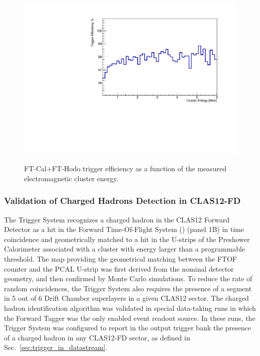 \begin{figure}[!htb]
 \centering
{\includegraphics[width=.5\textwidth]{img/FT_ClusterEfficiencyHODO.pdf}}
 \caption{FT-Cal+FT-Hodo trigger efficiency as a function of the measured electromagnetic cluster energy.}
 \label{fig:FT_ClusterEfficiencyHODO}
\end{figure}

\subsubsection{Validation of Charged Hadrons Detection in CLAS12-FD}

The Trigger System recognizes a charged hadron in the CLAS12 Forward Detector as a hit in the Forward Time-Of-Flight System (\cite{ftof-ref}) (panel 1B) in time coincidence and geometrically matched to a hit in the U-strips of the Preshower Calorimeter \cite{ec-ref} associated with a cluster with energy larger than a programmable threshold. The map providing the geometrical matching between the FTOF counter and the PCAL U-strip was first derived from the nominal detector geometry, and then confirmed by Monte Carlo simulations. To reduce the rate of random coincidences, the Trigger System also requires the presence of a segment in 5 out of 6 Drift Chamber superlayers in a given CLAS12 sector. The charged hadron identification algorithm was validated in special data-taking runs in which the Forward Tagger was the only enabled event readout source. In these runs, the Trigger System was configured to report in the output trigger bank the presence of a charged hadron in any CLAS12-FD sector, as defined in Sec.~\ref{sec:trigger_in_datastream}. 

